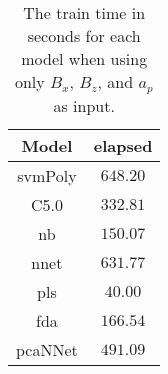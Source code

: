 \begin{table}[!ht]
	\centering
	\begin{tabular}{|c|c|}
		\hline
		Model & elapsed \\ \hline
		svmPoly & $648.20$ \\ \hline
		C5.0 & $332.81$ \\ \hline
		nb & $150.07$ \\ \hline
		nnet & $631.77$ \\ \hline
		pls & $40.00$ \\ \hline
		fda & $166.54$ \\ \hline
		pcaNNet & $491.09$ \\ \hline
	\end{tabular}
	\caption{The train time in seconds for each model when using only $B_{x}$, $B_{z}$, and $a_{p}$ as input.}
	\label{tab:time:xzap:train}
\end{table}
